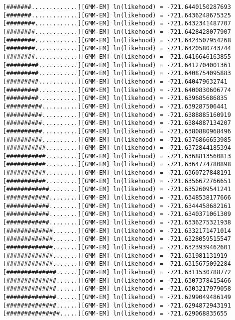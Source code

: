 \begin{verbatim}
    [#######.............][GMM-EM] ln(likehood) = -721.6440150287693
    [#######.............][GMM-EM] ln(likehood) = -721.6436248675325
    [########............][GMM-EM] ln(likehood) = -721.6432341487707
    [########............][GMM-EM] ln(likehood) = -721.6428428077907
    [########............][GMM-EM] ln(likehood) = -721.6424507954268
    [########............][GMM-EM] ln(likehood) = -721.6420580743744
    [########............][GMM-EM] ln(likehood) = -721.6416646163855
    [#########...........][GMM-EM] ln(likehood) = -721.6412704001361
    [#########...........][GMM-EM] ln(likehood) = -721.6408754095883
    [#########...........][GMM-EM] ln(likehood) = -721.640479632741
    [#########...........][GMM-EM] ln(likehood) = -721.6400830606774
    [#########...........][GMM-EM] ln(likehood) = -721.639685686835
    [##########..........][GMM-EM] ln(likehood) = -721.639287506441
    [##########..........][GMM-EM] ln(likehood) = -721.6388885160919
    [##########..........][GMM-EM] ln(likehood) = -721.6384887134207
    [##########..........][GMM-EM] ln(likehood) = -721.6380880968496
    [##########..........][GMM-EM] ln(likehood) = -721.6376866653985
    [###########.........][GMM-EM] ln(likehood) = -721.6372844185394
    [###########.........][GMM-EM] ln(likehood) = -721.6368813560813
    [###########.........][GMM-EM] ln(likehood) = -721.6364774780898
    [###########.........][GMM-EM] ln(likehood) = -721.6360727848191
    [###########.........][GMM-EM] ln(likehood) = -721.6356672766651
    [############........][GMM-EM] ln(likehood) = -721.6352609541241
    [############........][GMM-EM] ln(likehood) = -721.6348538177666
    [############........][GMM-EM] ln(likehood) = -721.6344458682161
    [############........][GMM-EM] ln(likehood) = -721.6340371061309
    [############........][GMM-EM] ln(likehood) = -721.6336275321938
    [#############.......][GMM-EM] ln(likehood) = -721.6332171471014
    [#############.......][GMM-EM] ln(likehood) = -721.6328059515547
    [#############.......][GMM-EM] ln(likehood) = -721.6323939462601
    [#############.......][GMM-EM] ln(likehood) = -721.631981131919
    [#############.......][GMM-EM] ln(likehood) = -721.6315675092284
    [##############......][GMM-EM] ln(likehood) = -721.6311530788772
    [##############......][GMM-EM] ln(likehood) = -721.6307378415466
    [##############......][GMM-EM] ln(likehood) = -721.6303217979058
    [##############......][GMM-EM] ln(likehood) = -721.6299049486149
    [##############......][GMM-EM] ln(likehood) = -721.6294872943191
    [###############.....][GMM-EM] ln(likehood) = -721.629068835655

\end{verbatim}
